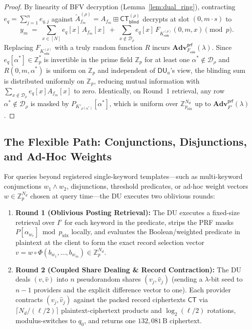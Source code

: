 \documentclass[11pt,a4paper]{article}
\begin{document}
\begin{proof}
By linearity of BFV decryption (Lemma~\ref{lem:dual_ring}), contracting $e_q = \sum_{j=1}^n e_{q,j}$ against $\widetilde{A}_{f_m}^{(\rho)} = A_{f_m} \boxplus \mathsf{CT}_{\mathsf{blind}}^{(\rho)}$ decrypts at slot $(0, m\cdot s)$ to
\begin{equation}
    y_m \;=\; \sum_{x \in [N]} e_q[x]\, A_{f_m}[x] \;+\; \sum_{x \notin \mathcal{D}_\rho} e_q[x]\, F_{K_{\mathsf{role}}^{(\rho)}}(0, m, x) \pmod p.
\end{equation}
Replacing $F_{K_{\mathsf{role}}^{(\rho)}}$ with a truly random function $R$ incurs $\mathbf{Adv}^{\mathsf{prf}}_{F_{\mathsf{role}}}(\lambda)$. Since $e_q[\alpha^*] \in \mathbb{Z}_p^*$ is invertible in the prime field $\mathbb{Z}_p$ for at least one $\alpha^* \notin \mathcal{D}_\rho$ and $R(0, m, \alpha^*)$ is uniform on $\mathbb{Z}_p$ and independent of $\mathsf{DU}_u$'s view, the blinding sum is distributed uniformly on $\mathbb{Z}_p$, reducing mutual information with $\sum_{x \notin \mathcal{D}_\rho} e_q[x]A_{f_m}[x]$ to zero. Identically, on Round~1 retrieval, any row $\alpha^* \notin \mathcal{D}_\rho$ is masked by $P_{K'_{\rho(\alpha^*)}}[\alpha^*]$, which is uniform over $\mathbb{Z}_{p_{\mathrm{idx}}}^{N_d}$ up to $\mathbf{Adv}^{\mathsf{prf}}_{F'}(\lambda)$.
\end{proof}

\subsection{The Flexible Path: Conjunctions, Disjunctions, and Ad-Hoc Weights}\label{sec:flexible}

For queries beyond registered single-keyword templates---such as multi-keyword conjunctions $w_1 \wedge w_2$, disjunctions, threshold predicates, or ad-hoc weight vectors $w \in \mathbb{Z}_p^{N_d}$ chosen at query time---the DU executes two oblivious rounds:
\begin{enumerate}\setlength{\itemsep}{2pt}\setlength{\parskip}{0pt}
    \item \textbf{Round 1 (Oblivious Posting Retrieval):} The DU executes a fixed-size retrieval over $I'$ for each keyword in the predicate, strips the PRF masks $P[\alpha_{w_r}] \bmod p_{\mathrm{idx}}$ locally, and evaluates the Boolean/weighted predicate in plaintext at the client to form the exact record selection vector $v = w \circ \Phi(b_{w_1}, \dots, b_{w_m}) \in \mathbb{Z}_p^{N_d}$.
    \item \textbf{Round 2 (Coupled Share Dealing \& Record Contraction):} The DU deals $(v, \hat{v})$ into $n$ pseudorandom shares $(v_j, \hat{v}_j)$ (sending a $\lambda$-bit seed to $n-1$ providers and the explicit difference vector to one). Each provider contracts $(v_j, \hat{v}_j)$ against the packed record ciphertexts $\mathsf{CT}$ via $\lceil N_d / (\ell/2)\rceil$ plaintext-ciphertext products and $\log_2(\ell/2)$ rotations, modulus-switches to $q_0$, and returns one $132{,}081\,\text{B}$ ciphertext.
\end{enumerate}
\end{document}
